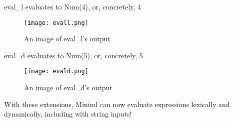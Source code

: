 \documentclass{article}
\begin{document}
eval{\_}l evaluates to Num(4), or, concretely, 4
\begin{figure} [H]
    \centering
    \texttt{[image: evall.png]}
    \caption{An image of eval{\_}l's output}
    \label{fig:eval_output1}
\end{figure}

eval{\_}d evaluates to Num(5), or, concretely, 5
\begin{figure} [H]
    \centering
    \texttt{[image: evald.png]}
    \caption{An image of eval{\_}d's output}
    \label{fig:eval_output2}
\end{figure} 

With these extensions, Miniml can now evaluate expressions lexically and dynamically, including with string inputs!
\end{document}

